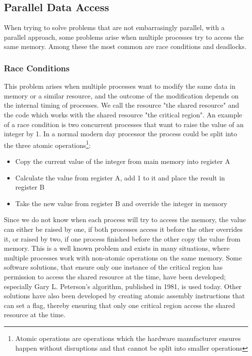 \subsection{Parallel Data Access}
When trying to solve problems that are not embarrasingly parallel, with a parallel approach, some problems arise when multiple processes try to access the same memory. Among these the most common are race conditions and deadlocks.

\subsubsection{Race Conditions}
This problem arises when multiple processes want to modify the same data in memory or a similar resource, and the outcome of the modification depends on the internal timing of processes. We call the resource "the shared resource" and the code which works with the shared resource "the critical region". An example of a race condition is two concurrent processes that want to raise the value of an integer by 1. In a normal modern day processor the process could be split into the three atomic operations\footnote{Atomic operations are operations which the hardware manufacturer ensures happen without disruptions and that cannot be split into smaller operations}:

\begin{itemize}
\item Copy the current value of the integer from main memory into register A
\item Calculate the value from register A, add 1 to it and place the result in register B
\item Take the new value from register B and override the integer in memory
\end{itemize}

Since we do not know when each process will try to access the memory, the value can either be raised by one, if both processes access it before the other overrides it, or raised by two, if one process finished before the other copy the value from memory. This is a well known problem and exists in many situations, where multiple processes work with non-atomic operations on the same memory. Some software solutions, that ensure only one instance of the critical region has permission to access the shared resource at the time, have been developed; especially Gary L. Peterson's algorithm, published in 1981, is used today. Other solutions have also been developed by creating atomic assembly instructions that can set a flag, thereby ensuring that only one critical region access the shared resource at the time.

